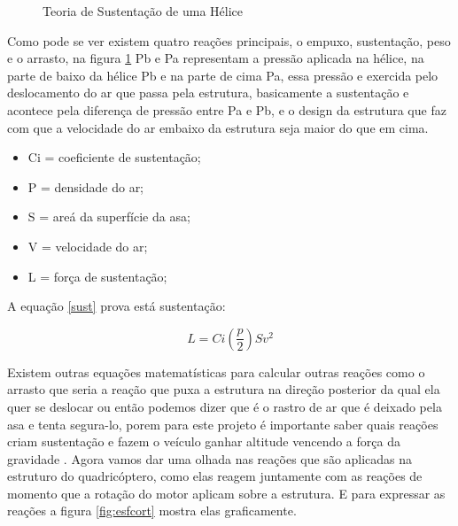 \begin{figure}[H]
	\centering
	\caption{Teoria de Sustentação de uma Hélice}
	\fontsize{9pt}{12pt}\selectfont
	\def\svgwidth{13cm}
	
	\label{fig:asa}
\end{figure}

Como pode se ver existem quatro reações principais, o empuxo, sustentação, peso e o arrasto, na figura \ref{fig:asa} Pb e Pa representam a pressão aplicada na hélice, na  parte de baixo da hélice Pb e na parte de cima Pa, essa pressão e exercida pelo deslocamento do ar que passa pela estrutura, basicamente a sustentação e acontece pela diferença de pressão entre Pa e Pb, e o design da estrutura que faz com que a velocidade do ar embaixo da estrutura seja maior do que em cima.

\begin{itemize}
    \item Ci = coeficiente de sustentação;
    \item P = densidade do ar; 
    \item S = areá da superfície da asa;
    \item V = velocidade do ar; 
    \item L = força de sustentação;
\end{itemize}{}
A equação \ref{sust} prova está sustentação: 

\begin{equation}
    \label{sust}
    L=Ci\left(\frac{p}{2}\right)Sv^2
\end{equation}

Existem outras equações matematísticas para calcular outras reações como o arrasto que seria a reação que puxa a estrutura na direção posterior da qual ela quer se deslocar ou então podemos dizer que é o rastro de ar que é deixado pela asa e tenta segura-lo, porem para este projeto é importante saber quais reações criam sustentação e fazem o veículo ganhar altitude vencendo a força da gravidade \cite{inproceedings}.
Agora vamos dar uma olhada nas reações que são aplicadas na estruturo do quadricóptero, como elas reagem juntamente com as reações de momento que a rotação do motor aplicam sobre a estrutura. E para expressar as reações a figura \ref{fig:esfcort} mostra elas graficamente. 

